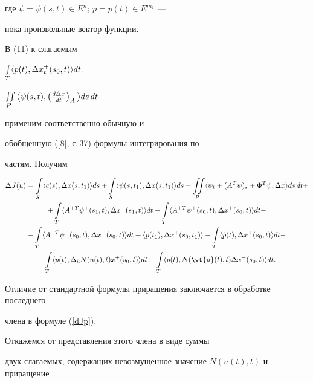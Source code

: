 где $\psi=\psi (s,t)\in E^n$; $p=p(t)\in E^{m_1}$ ---


пока произвольные вектор-функции.





В (11) к слагаемым


$\int\limits_T \langle p(t),\Delta x_t^+(s_0,t)\rangle dt$,


$\iint\limits_P\big\langle\psi(s,t),\left(\frac{d\Delta x}{dt}\right)_A\big\rangle ds\,dt$


применим соответственно обычную и 


обобщенную ([8], с.\,37) формулы интегрирования по


частям. Получим


\begin{multline}


\label{dJp}


\Delta J(u)=\il_S \la c(s),\Delta x(s,t_1)\ra ds+\il_S


\la\psi(s,t_1),\Delta x(s,t_1)\ra ds- 


\iil_P \la\psi_t+(A^T\psi)_s+\Phi^T\psi,\Delta x\ra ds\,dt+ \\




+\il_T \la A^{+T}\psi^+(s_1,t),\Delta x^+(s_1,t)\ra dt-


\il_T \la A^{+T}\psi^+(s_0,t),\Delta x^+(s_0,t)\ra dt- \\


%


-\il_T \la A^{-T}\psi^-(s_0,t),\Delta x^-(s_0,t)\ra dt+ 


\la p(t_1),\Delta x^+(s_0,t_1)\ra


-\il_T \la \Dot{p}(t),\Delta x^+(s_0,t)\ra dt- \\


%


-\il_T \la p(t),\Delta_{\Tilde{u}}N(u(t),t)x^+(s_0,t)\ra dt-


\il_T \la p(t),N(\wt{u}(t),t)\Delta x^+(s_0,t)\ra dt.


\end{multline}





Отличие от стандартной формулы приращения заключается в обработке последнего


члена в формуле (\ref{dJp}). 


Откажемся от представления этого члена в виде суммы 


двух слагаемых, содержащих невозмущенное значение $N(u(t),t)$ и приращение


